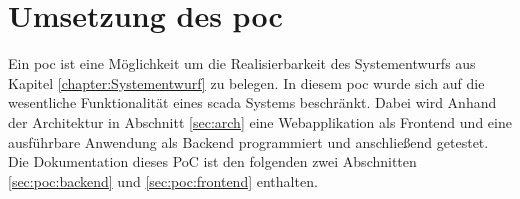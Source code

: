 \chapter{Umsetzung des \acl{poc}}
Ein \ac{poc} ist eine Möglichkeit um die Realisierbarkeit des Systementwurfs aus Kapitel \ref{chapter:Systementwurf} zu belegen.
In diesem  \ac{poc} wurde sich auf die wesentliche Funktionalität eines \ac{scada} Systems beschränkt.
Dabei wird Anhand der Architektur in Abschnitt \ref{sec:arch} eine Webapplikation als Frontend und eine ausführbare Anwendung als Backend programmiert und anschließend getestet.
Die Dokumentation dieses PoC ist den folgenden zwei Abschnitten \ref{sec:poc:backend} und \ref{sec:poc:frontend} enthalten.%


